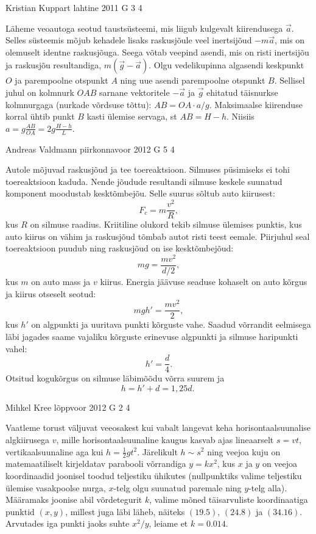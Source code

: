 \documentclass[11pt, twoside]{article}
\begin{document}
{%
{Kristian Kuppart} %
{lahtine} %
{2011} %
{G 3} %
{4} %
{

\ifSolution
Läheme veoautoga seotud taustsüsteemi, mis liigub kulgevalt kiirendusega $\vec a$. Selles süsteemis mõjub
kehadele lisaks raskusjõule veel inertsijõud $-m\vec a$, mis on olemuselt identne raskusjõuga.
Seega võtab veepind asendi, mis on risti inertsijõu ja raskusjõu resultandiga, $m(\vec g-\vec a)$.
Olgu vedelikupinna algasendi keskpunkt $O$ ja parempoolne otspunkt $A$ ning uue asendi parempoolne otspunkt $B$.
Sellisel juhul on kolmnurk $OAB$ sarnane vektoritele $-\vec a$ ja $\vec g$ ehitatud täisnurkse kolmnurgaga (nurkade võrdsuse tõttu):
$AB=OA\cdot a/g$. Maksimaalse kiirenduse korral ühtib punkt $B$ kasti ülemise servaga, st $AB=H-h$. Niisiis
$a=g\frac {AB}{OA}=2g\frac {H-h}{L}.$
\fi
}

{Andreas Valdmann} %
{piirkonnavoor} %
{2012} %
{G 5} %
{4} %
{

\ifSolution
Autole mõjuvad raskusjõud ja tee toereaktsioon. Silmuses püsimiseks ei tohi
toereaktsioon kaduda. Nende jõudude resultandi silmuse keskele
suunatud komponent moodustab kesktõmbejõu. Selle suurus sõltub auto kiirusest:
\[F_c=m\frac{v^2}{R},\]
kus $R$ on silmuse raadius.
Kriitiline olukord tekib silmuse ülemises punktis, kus auto kiirus on vähim ja
raskusjõud tõmbab autot risti teest eemale. Piirjuhul seal
toereaktsioon puudub ning raskusjõud on ise kesktõmbejõud:
\[ mg=\frac{mv^2}{d/2},\]
kus $m$ on auto mass ja $v$ kiirus.
Energia jäävuse seaduse kohaselt on auto kõrgus ja kiirus otseselt seotud:
\[ mgh'=\frac{mv^2}{2},\]
kus $h'$ on algpunkti ja uuritava punkti kõrguste vahe. Saadud võrrandit 
eelmisega läbi jagades saame vajaliku kõrguste erinevuse algpunkti ja silmuse 
haripunkti vahel:
\[ h'=\frac{d}{4}.\]
Otsitud kogukõrgus on silmuse läbimõõdu võrra suurem ja
\[ h=h'+d=1,25d.\;\]
\fi
}

{Mihkel Kree} %
{lõppvoor} %
{2012} %
{G 2} %
{4} %
{

\ifSolution
Vaatleme torust väljuvat veeosakest kui vabalt langevat keha horisontaalsuunalise algkiirusega $v$, mille horisontaalsuunaline kaugus kasvab ajas lineaarselt $s=vt$, vertikaalsuunaline aga kui $h=\frac{1}{2}gt^2$. Järelikult $h\sim s^2$ ning veejoa kuju on matemaatiliselt kirjeldatav parabooli võrrandiga $y=kx^2$, kus $x$ ja $y$ on veejoa koordinaadid joonisel toodud teljestiku ühikutes (nullpunktiks valime teljestiku ülemise vasakpoolse nurga, $x$-telg olgu suunatud paremale ning $y$-telg alla). Määramaks joonise abil võrdetegurit $k$, valime mõned täisarvuliste koordinaatiga punktid $(x,y)$, millest juga läbi läheb, näiteks $(\num{19,5})$, $(\num{24,8})$ ja $(\num{34,16})$. Arvutades iga punkti jaoks suhte $x^2/y$, leiame et $k=\num{0.014}$. 
	
}}
\end{document}
